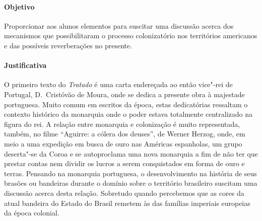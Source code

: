 \documentclass[12pt]{extarticle}
\begin{document}
\paragraph{Objetivo} Proporcionar aos alunos elementos para suscitar
uma discussão acerca dos mecanismos que possibilitaram o processo 
colonizatório nos territórios americanos e das possíveis reverberações
no presente.

\paragraph{Justificativa} O primeiro texto do \emph{Tratado} é uma carta
endereçada ao então vice"-rei de Portugal, D.~Cristóvão de Moura, onde 
se dedica a presente obra à majestade portuguesa. Muito comum em escritos
da época, estas dedicatórias ressaltam o contexto histórico da monarquia 
onde o poder estava totalmente centralizado na figura do rei.
A relação entre monarquia e colonização é muito representada, também,
no filme ``Aguirre: a cólera dos deuses'', de Werner Herzog, onde, em
meio a uma expedição em busca de ouro nas Américas espanholas, um grupo 
deserta"-se da Coroa e se autoproclama uma nova monarquia a fim de não ter 
que prestar contas nem dividir os lucros a serem conquistados em forma
de ouro e terras.
Pensando na monarquia portuguesa, o desenvolvimento na história de seus
brasões ou bandeiras durante o domínio sobre o território brasileiro
suscitam uma discussão acerca desta relação. Sobretudo quando percebemos
que as cores da atual bandeira do Estado do Brasil remetem às das famílias
imperiais europeias da época colonial. 
\end{document}
